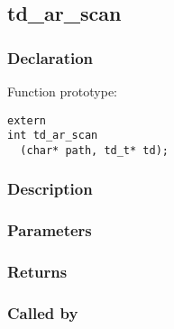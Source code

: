 
\newpage
\subsection{td\_ar\_scan}
\subsubsection{Declaration} Function prototype:

\begin{verbatim}
extern
int td_ar_scan
  (char* path, td_t* td);
\end{verbatim}

\subsubsection{Description}



\subsubsection{Parameters}
\subsubsection{Returns}
\subsubsection{Called by}
